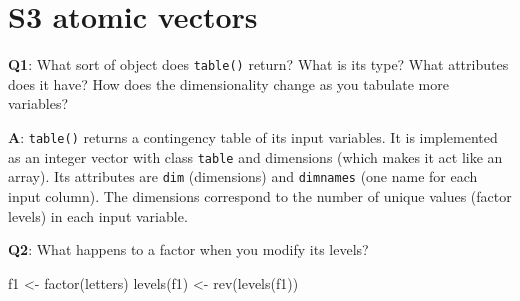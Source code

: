 \documentclass[
]{krantz}
\makeatletter
\newenvironment{Shaded}{\begin{snugshade}}{\end{snugshade}}
\newcommand{\CommentTok}[1]{\textcolor[rgb]{0.56,0.35,0.01}{\textit{#1}}}
\newcommand{\DecValTok}[1]{\textcolor[rgb]{0.00,0.00,0.81}{#1}}
\newcommand{\KeywordTok}[1]{\textcolor[rgb]{0.13,0.29,0.53}{\textbf{#1}}}
\newcommand{\NormalTok}[1]{#1}
\newcommand{\StringTok}[1]{\textcolor[rgb]{0.31,0.60,0.02}{#1}}
\newenvironment{kframe}{%
\medskip{}
\setlength{\fboxsep}{.8em}
 \def\at@end@of@kframe{}%
 \ifinner\ifhmode%
  \def\at@end@of@kframe{\end{minipage}}%
  \begin{minipage}{\columnwidth}%
 \fi\fi%
 \def\FrameCommand##1{\hskip\@totalleftmargin \hskip-\fboxsep
 \colorbox{shadecolor}{##1}\hskip-\fboxsep
     \hskip-\linewidth \hskip-\@totalleftmargin \hskip\columnwidth}%
 \MakeFramed {\advance\hsize-\width
   \@totalleftmargin\z@ \linewidth\hsize
   \@setminipage}}%
 {\par\unskip\endMakeFramed%
 \at@end@of@kframe}
\renewenvironment{Shaded}{\begin{kframe}}{\end{kframe}}
\renewcommand{\KeywordTok} [1]{\textcolor[rgb]{0.00,0.44,0.13}{{#1}}}
\renewcommand{\DecValTok}  [1]{\textcolor[rgb]{0.25,0.63,0.44}{{#1}}}
\renewcommand{\StringTok}  [1]{\textcolor[rgb]{0.25,0.44,0.63}{{#1}}}
\renewcommand{\CommentTok} [1]{\textcolor[rgb]{0.38,0.63,0.69}{{#1}}}
\renewcommand{\NormalTok}  [1]{{#1}}
\makeatother
\begin{document}
\hypertarget{s3-atomic-vectors}{%
\section{S3 atomic vectors}\label{s3-atomic-vectors}}

\textbf{{Q1}}: What sort of object does \texttt{table()} return? What is its type? What attributes does it have? How does the dimensionality change as you tabulate more variables?

\textbf{{A}}: \texttt{table()} returns a contingency table of its input variables. It is implemented as an integer vector with class \texttt{table} and dimensions (which makes it act like an array). Its attributes are \texttt{dim} (dimensions) and \texttt{dimnames} (one name for each input column). The dimensions correspond to the number of unique values (factor levels) in each input variable.

\begin{Shaded}
\end{Shaded}

\textbf{{Q2}}: What happens to a factor when you modify its levels?

\begin{Shaded}
\begin{Highlighting}[]
\NormalTok{f1 <-}\StringTok{ }\KeywordTok{factor}\NormalTok{(letters)}
\KeywordTok{levels}\NormalTok{(f1) <-}\StringTok{ }\KeywordTok{rev}\NormalTok{(}\KeywordTok{levels}\NormalTok{(f1))}
\end{Highlighting}
\end{Shaded}
\end{document}
